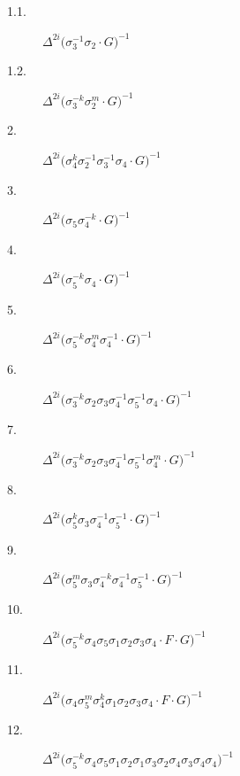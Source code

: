 \begin{description}
    \item[1.1.] $\displaystyle \Delta^{2i} \big( \allowbreak\sigma_{3}^{-1}\allowbreak\sigma_{2} \cdot G \big)^{-1}$
    \item[1.2.] $\displaystyle \Delta^{2i} \big( \allowbreak\sigma_{3}^{-k}\allowbreak\sigma_{2}^{m} \cdot G \big)^{-1}$
    \item[2.] $\displaystyle \Delta^{2i} \big( \allowbreak\sigma_{4}^{k}\allowbreak\sigma_{2}^{-1}\allowbreak\sigma_{3}^{-1}\allowbreak\sigma_{4} \cdot G \big)^{-1}$
    \item[3.] $\displaystyle \Delta^{2i} \big( \allowbreak\sigma_{5}\allowbreak\sigma_{4}^{-k} \cdot G \big)^{-1}$
    \item[4.] $\displaystyle \Delta^{2i} \big( \allowbreak\sigma_{5}^{-k}\allowbreak\sigma_{4} \cdot G \big)^{-1}$
    \item[5.] $\displaystyle \Delta^{2i} \big( \allowbreak\sigma_{5}^{-k}\allowbreak\sigma_{4}^{m}\allowbreak\sigma_{4}^{-1} \cdot G \big)^{-1}$
    \item[6.] $\displaystyle \Delta^{2i} \big( \allowbreak\sigma_{3}^{-k}\allowbreak\sigma_{2}\allowbreak\sigma_{3}\allowbreak\sigma_{4}^{-1}\allowbreak\sigma_{5}^{-1}\allowbreak\sigma_{4} \cdot G \big)^{-1}$
    \item[7.] $\displaystyle \Delta^{2i} \big( \allowbreak\sigma_{3}^{-k}\allowbreak\sigma_{2}\allowbreak\sigma_{3}\allowbreak\sigma_{4}^{-1}\allowbreak\sigma_{5}^{-1}\allowbreak\sigma_{4}^{m} \cdot G \big)^{-1}$
    \item[8.] $\displaystyle \Delta^{2i} \big( \allowbreak\sigma_{5}^{k}\allowbreak\sigma_{3}\allowbreak\sigma_{4}^{-1}\allowbreak\sigma_{5}^{-1} \cdot G \big)^{-1}$
    \item[9.] $\displaystyle \Delta^{2i} \big( \allowbreak\sigma_{5}^{m}\allowbreak\sigma_{3}\allowbreak\sigma_{4}^{-k}\allowbreak\sigma_{4}^{-1}\allowbreak\sigma_{5}^{-1} \cdot G \big)^{-1}$
    \item[10.] $\displaystyle \Delta^{2i} \big( \allowbreak\sigma_{5}^{-k}\allowbreak\sigma_{4}\allowbreak\sigma_{5}\allowbreak\sigma_{1}\allowbreak\sigma_{2}\allowbreak\sigma_{3}\allowbreak\sigma_{4} \cdot F \cdot G \big)^{-1}$
    \item[11.] $\displaystyle \Delta^{2i} \big( \allowbreak\sigma_{4}\allowbreak\sigma_{5}^{m}\allowbreak\sigma_{4}^{k}\allowbreak\sigma_{1}\allowbreak\sigma_{2}\allowbreak\sigma_{3}\allowbreak\sigma_{4} \cdot F \cdot G \big)^{-1}$
    \item[12.] $\displaystyle \Delta^{2i} \big( \allowbreak\sigma_{5}^{-k}\allowbreak\sigma_{4}\allowbreak\sigma_{5}\allowbreak\sigma_{1}\allowbreak\sigma_{2}\allowbreak\sigma_{1}\allowbreak\sigma_{3}\allowbreak\sigma_{2}\allowbreak\sigma_{4}\allowbreak\sigma_{3}\allowbreak\sigma_{4}\allowbreak\sigma_{4} \big)^{-1}$

\end{description}
